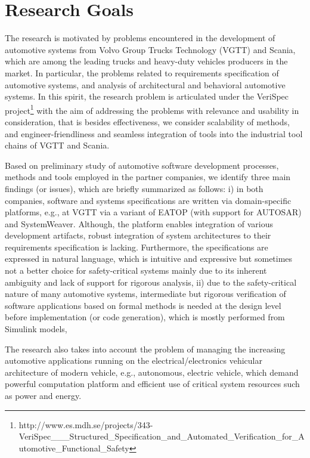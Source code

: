 \chapter{Research Goals}
The research is motivated by problems encountered in the development of automotive systems from Volvo Group Trucks Technology (VGTT) and Scania, which are among the leading trucks and heavy-duty vehicles producers in the market. In particular, the problems related to requirements specification of automotive systems, and analysis of architectural and behavioral automotive systems. In this spirit, the research problem is articulated under the VeriSpec project\footnote{http://www.es.mdh.se/projects/343-VeriSpec\_\_\_Structured\_Specification\_and\_Automated\_Verification\_for\_Automotive\_Functional\_Safety} with the aim of addressing the problems with relevance and usability in consideration, that is besides effectiveness, we consider scalability of methods, and engineer-friendliness and seamless integration of tools into the industrial tool chains of VGTT and Scania.

Based on preliminary study of automotive software development processes, methods and tools employed in the partner companies, we identify three main findings (or issues), which are briefly summarized as follows: i) in both companies, software and systems specifications are written via domain-specific platforms, e.g., at VGTT via a variant of EATOP (with support for AUTOSAR) and SystemWeaver. Although, the platform enables integration of various development artifacts, robust integration of system architectures to their requirements specification is lacking. Furthermore, the specifications are expressed in natural language, which is intuitive and expressive but sometimes not a better choice for safety-critical systems mainly due to its inherent ambiguity and lack of support for rigorous analysis, ii) due to the safety-critical nature of many automotive systems, intermediate but rigorous verification of software applications based on formal methods is needed at the design level before implementation (or code generation), which is mostly performed from Simulink models,

The research also takes into account the problem of managing the increasing automotive applications running on the electrical/electronics vehicular architecture of modern vehicle, e.g., autonomous, electric vehicle, which demand powerful computation platform and efficient use of critical system resources such as power and energy.


